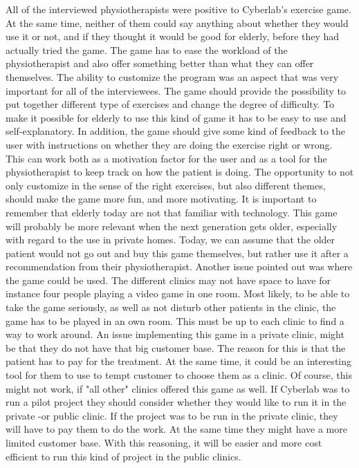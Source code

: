 All of the interviewed physiotherapists were positive to Cyberlab’s exercise game. At the same time, neither of them could say anything about whether they would use it or not, and if they thought it would be good for elderly, before they had actually tried the game. The game has to ease the workload of the physiotherapist and also offer something better than what they can offer themselves. The ability to customize the program was an aspect that was very important for all of the interviewees. The game should provide the possibility to put together different type of exercises and change the degree of difficulty. To make it possible for elderly to use this kind of game it has to be easy to use and self-explanatory. In addition, the game should give some kind of feedback to the user with instructions on whether they are doing the exercise right or wrong. This can work both as a motivation factor for the user and as a tool for the physiotherapist to keep track on how the patient is doing. The opportunity to not only customize in the sense of the right exercises, but also different themes, should make the game more fun, and more motivating. It is important to remember that elderly today are not that familiar with technology. This game will probably be more relevant when the next generation gets older, especially with regard to the use in private homes. Today, we can assume that the older patient would not go out and buy this game themselves, but rather use it after a recommendation from their physiotherapist. Another issue pointed out was where the game could be used. The different clinics may not have space to have for instance four people playing a video game in one room. Most likely, to be able to take the game seriously, as well as not disturb other patients in the clinic, the game has to be played in an own room. This must be up to each clinic to find a way to work around. An issue implementing this game in a private clinic, might be that they do not have that big customer base. The reason for this is that the patient has to pay for the treatment. At the same time, it could be an interesting tool for them to use to tempt customer to choose them as a clinic. Of course, this might not work, if "all other" clinics offered this game as well. If Cyberlab was to run a pilot project they should consider whether they would like to run it in the private -or public clinic. If the project was to be run in the private clinic, they will have to pay them to do the work. At the same time they might have a more limited customer base. With this reasoning, it will be easier and more cost efficient to run this kind of project in the public clinics. \\ \\
